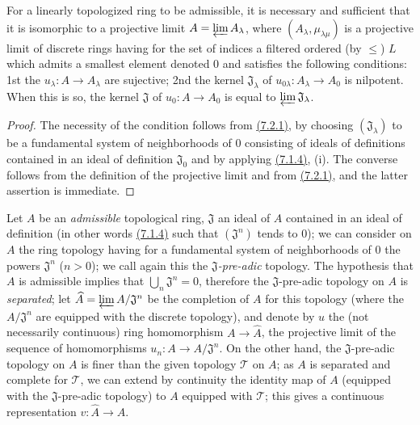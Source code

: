 \begin{lem}[7.2.2]
\label{lem-0.7.2.2}
For a linearly topologized ring to be admissible, it is necessary and sufficient
that it is isomorphic to a projective limit $A=\varprojlim A_\lambda$, where
$(A_\lambda,\mu_{\lambda\mu})$ is a projective limit of discrete rings having
for the set of indices a filtered ordered (by $\leqslant$) $L$ which admits
a smallest element denoted $0$ and satisfies the following conditions:
1st the $u_\lambda:A\to A_\lambda$ are sujective;
2nd the kernel $\mathfrak{J}_\lambda$ of
$u_{0\lambda}:A_\lambda\to A_0$ is nilpotent. When this is so, the kernel
$\mathfrak{J}$ of $u_0:A\to A_0$ is equal to $\varprojlim\mathfrak{J}_\lambda$.
\end{lem}

\begin{proof}
\label{proof-lem-0.7.2.2}
The necessity of the condition follows from \hyperref[env-0.7.2.1]{(7.2.1)}, by choosing
$(\mathfrak{J}_\lambda)$ to be a fundamental system of neighborhoods of $0$
consisting of ideals of definitions contained in an ideal of definition
$\mathfrak{J}_0$ and by applying \hyperref[prop-0.7.1.4]{(7.1.4)}, (i). The converse follows
from the definition of the projective limit and from \hyperref[env-0.7.2.1]{(7.2.1)}, and the
latter assertion is immediate.
\end{proof}

\begin{env}[7.2.3]
\label{env-0.7.2.3}
Let $A$ be an {\em admissible} topological ring, $\mathfrak{J}$ an ideal of $A$
contained in an ideal of definition (in other words \hyperref[prop-0.7.1.4]{(7.1.4)} such that
$(\mathfrak{J}^n)$ tends to $0$); we can consider on $A$ the ring topology
having for a fundamental system of neighborhoods of $0$ the powers
$\mathfrak{J}^n$ ($n>0$); we call again this the {\em $\mathfrak{J}$-pre-adic}
topology. The hypothesis that $A$ is admissible implies that
$\bigcup_n\mathfrak{J}^n=0$, therefore the $\mathfrak{J}$-pre-adic topology on
$A$ is {\em separated}; let $\widehat{A}=\varprojlim A/\mathfrak{J}^n$ be the
completion of $A$ for this topology (where the $A/\mathfrak{J}^n$ are equipped
with the discrete topology), and denote by $u$ the (not necessarily continuous)
ring homomorphism $A\to\widehat{A}$, the projective limit of the sequence of
homomorphisms $u_n:A\to A/\mathfrak{J}^n$. On the other hand, the
$\mathfrak{J}$-pre-adic topology on $A$ is finer than the given topology
$\mathcal{T}$ on $A$; as $A$ is separated and complete for $\mathcal{T}$, we can
extend by continuity the identity map of $A$ (equipped with the
$\mathfrak{J}$-pre-adic topology) to $A$ equipped with $\mathcal{T}$; this
gives a continuous representation $v:\widehat{A}\to A$.
\end{env}

